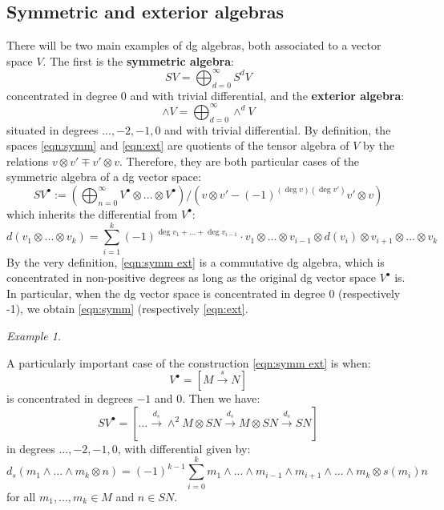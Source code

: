 \documentclass[12pt]{amsart}
\numberwithin{equation}{section}
\theoremstyle{definition}
\theoremstyle{remark}
\newtheorem{example}[theorem]{Example}
\renewcommand{\1}{\mathbf{1}}
\begin{document}
\subsection{Symmetric and exterior algebras}
\label{sub:sym ext}

There will be two main examples of dg algebras, both associated to a vector space $V$. The first is the \textbf{symmetric algebra}:
\begin{equation}
\label{eqn:symm}
S V = \bigoplus_{d=0}^\infty S^d V
\end{equation}
concentrated in degree 0 and with trivial differential, and the \textbf{exterior algebra}:
\begin{equation}
\label{eqn:ext}
\wedge V = \bigoplus_{d=0}^\infty \wedge^d V
\end{equation}
situated in degrees $...,-2,-1,0$ and with trivial differential. By definition, the spaces \eqref{eqn:symm} and \eqref{eqn:ext} are quotients of the tensor algebra of $V$ by the relations $v\otimes v' \mp v' \otimes v$. Therefore, they are both particular cases of the symmetric algebra of a dg vector space:
\begin{equation}
\label{eqn:symm ext}
S V^\bullet := \left(\bigoplus_{n=0}^\infty V^\bullet \otimes ... \otimes V^\bullet \right) \Big/ \left( v \otimes v' - (-1)^{(\deg v)(\deg v')} v' \otimes v \right)
\end{equation}
which inherits the differential from $V^\bullet$:
$$
d(v_1 \otimes ... \otimes v_k) = \sum_{i=1}^k (-1)^{\deg v_1 + ... + \deg v_{i-1}} \cdot v_1 \otimes ... \otimes v_{i-1} \otimes d(v_i) \otimes v_{i+1} \otimes ... \otimes v_k
$$
By the very definition, \eqref{eqn:symm ext} is a commutative dg algebra, which is concentrated in non-positive degrees as long as the original dg vector space $V^\bullet$ is. In particular, when the dg vector space is concentrated in degree 0 (respectively -1), we obtain \eqref{eqn:symm} (respectively \eqref{eqn:ext}.

\begin{example}
\label{ex:important}

A particularly important case of the construction \eqref{eqn:symm ext} is when:
$$
V^\bullet = \left[ M \stackrel{s}\longrightarrow N \right]
$$
is concentrated in degrees $-1$ and 0. Then we have:
$$
S V^\bullet = \left[ ... \stackrel{d_s}\longrightarrow \wedge^2 M \otimes S N \stackrel{d_s}\longrightarrow M \otimes S N \stackrel{d_s}\longrightarrow S N \right]
$$
in degrees $...,-2,-1,0$, with differential given by:
\begin{equation}
\label{eqn:ds}
d_s(m_1 \wedge... \wedge m_k \otimes n) = (-1)^{k-1} \sum_{i=0}^k m_1 \wedge ... \wedge m_{i-1} \wedge m_{i+1} \wedge ... \wedge m_k \otimes s(m_i)n
\end{equation}
for all $m_1,...,m_k \in M$ and $n \in S N$.

\end{example}
\end{document}
